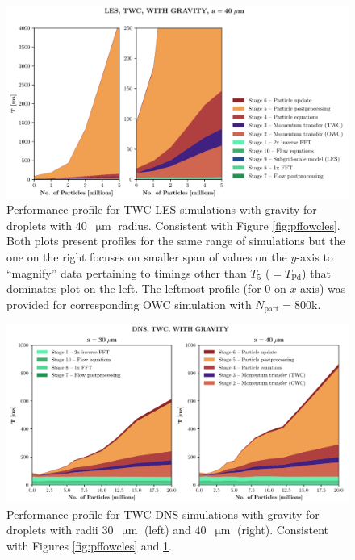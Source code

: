 
\begin{figure}
\centering
\includegraphics[width=13.5cm]{figures/3-08_pfftwcles.pdf}
\caption{
Performance profile for TWC LES simulations with gravity for droplets with $40$~$\upmu\text{m}$ radius.
Consistent with Figure \ref{fig:pffowcles}.
Both plots present profiles for the same range of simulations but the one on the right focuses on smaller span of values on the $y$-axis to ``magnify'' data pertaining to timings other than $T_5$ ($ = T_{\text{Pd}}$) that dominates plot on the left.
The leftmost profile (for $0$ on $x$-axis) was provided for corresponding OWC simulation with $N_{\text{part}} = 800\text{k}$. 
}
\label{fig:pfftwcles}
\end{figure}


\begin{figure}
\centering
\includegraphics[width=13.5cm]{figures/3-09_pfftwcdns.pdf}
\caption{
Performance profile for TWC DNS simulations with gravity for droplets with radii $30$~$\upmu\text{m}$ (left) and $40$~$\upmu\text{m}$ (right).
Consistent with Figures \ref{fig:pffowcles} and \ref{fig:pfftwcles}.
}
\label{fig:pfftwcdns}
\end{figure}

